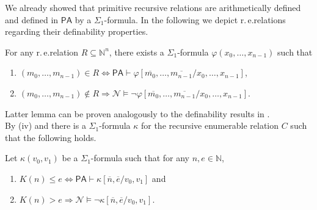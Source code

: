 We already showed that primitive recursive relations are arithmetically defined and defined in $\mathsf{PA}$ by a $\Sigma_1$-formula. In the following we depict r.\,e.\@ relations regarding their definability properties.

\begin{lem} \label{lem:definlemma}
For any r.\,e.\@ relation $R \subseteq \mathbb{N}^n$, there exists a $\Sigma_1$-formula $\varphi(x_0, \ldots, x_{n-1})$ such that
\begin{enumerate}
\item $(m_0, \ldots, m_{n-1}) \in R \Leftrightarrow \mathsf{PA}\vdash \varphi[\overline{m_0}, \ldots, \overline{m_{n-1}}/x_0, \ldots, x_{n-1}]$,
\item $(m_0, \ldots, m_{n-1}) \notin R \Rightarrow \mathcal{N}\vDash \lnot \varphi[\overline{m_0}, \ldots, \overline{m_{n-1}}/x_0, \ldots, x_{n-1}]$.
\end{enumerate} 
\end{lem}
Latter lemma can be proven analogously to the definability results in .
\\

By (iv) and  there is a $\Sigma_1$-formula $\kappa$ for the recursive enumerable relation $C$ such that the following holds.


\begin{dfn}\label{dfn:kappa}
Let $\kappa(v_0,v_1)$ be a $\Sigma_1$-formula such that for any $n,e \in \mathbb{N}$,
\begin{enumerate}
\item $K(n) \le e\Leftrightarrow\mathsf{PA} \vdash \kappa[\overline{n}, \overline{e}/v_0,v_1]$ and
\item  $K(n) > e \Rightarrow \mathcal{N} \vDash \lnot \kappa[\overline{n}, \overline{e}/v_0,v_1].$
\end{enumerate}
\end{dfn}

